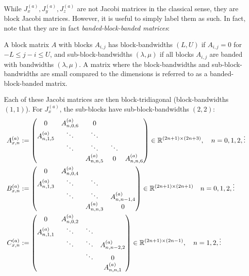 \documentclass[11pt, oneside]{article}   	%
\begin{document}
While $J_x^{(a)}, J_y^{(a)}, J_z^{(a)}$ are not Jacobi matrices in the classical sense, they are block Jacobi matrices. However, it is useful to simply label them as such. In fact, note that they are in fact \textit{banded-block-banded matrices}:

\begin{definition}
	A block matrix $A$ with blocks $A_{i,j}$ has block-bandwidths $(L,U)$ if $A_{i,j} = 0$ for $- L \leq j-i \leq U$, and sub-block-bandwidths $(\lambda, \mu)$ if all blocks $A_{i,j}$ are banded with bandwidths $(\lambda,\mu)$. A matrix where the block-bandwidths and sub-block-bandwidths are small compared to the dimensions is referred to as a banded-block-banded matrix. 
\end{definition}

Each of these Jacobi matrices are then block-tridiagonal (block-bandwidths $(1,1)$). For $J_x^{(a)}$, the sub-blocks have sub-block-bandwidths $(2,2)$:
\begin{align*}
	A^{(a)}_{x,n} &:= 
		\begin{pmatrix}
			0 & A^{(a)}_{n,0,6} & 0 & & \\
			A^{(a)}_{n,1,5} & \ddots & \ddots & & \\
			& \ddots & \ddots & \ddots & \\
			& & A^{(a)}_{n,n,5} & 0 & A^{(a)}_{n,n,6} \\
		\end{pmatrix} \in \mathbb{R}^{(2n+1)\times(2n+3)}, \quad n = 0,1,2,\vdots \\
	B^{(a)}_{x,n} &:= 
		\begin{pmatrix}
			0 & A^{(a)}_{n,0,4} & & \\
			A^{(a)}_{n,1,3} & \ddots & \ddots & \\
			& \ddots & \ddots & A^{(a)}_{n,n-1,4} \\
			& & A^{(a)}_{n,n,3} & 0
		\end{pmatrix} \in \mathbb{R}^{(2n+1)\times(2n+1)}  \quad n = 0,1,2,\vdots \\
	C^{(a)}_{x,n} &:= 
		\begin{pmatrix}
			0 & A^{(a)}_{n,0,2} & & \\
			A^{(a)}_{n,1,1} & \ddots & \ddots & \\
			& \ddots & \ddots &A^{(a)}_{n,n-2,2} \\
			& & \ddots & 0 \\
			& & & A^{(a)}_{n,n,1} \\
		\end{pmatrix} \in \mathbb{R}^{(2n+1)\times(2n-1)}, \quad n = 1,2,\vdots
\end{align*}
\end{document}
